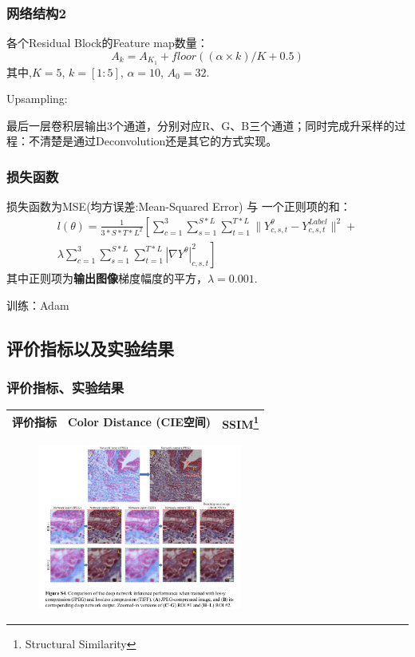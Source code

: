 \documentclass{beamer}
\begin{document}
\begin{frame}
\frametitle{网络结构2}
各个Residual Block的Feature map数量：
\begin{displaymath}
A_k = A_{K_1} + floor((\alpha \times k)/K + 0.5)
\end{displaymath}
其中,$K=5$, $k=[1:5]$, $\alpha=10$, $A_0 = 32$.
\vspace{1cm}
\par Upsampling:

最后一层卷积层输出3个通道，分别对应R、G、B三个通道；同时完成升采样的过程：不清楚是通过Deconvolution还是其它的方式实现。

\end{frame}


\begin{frame}
\frametitle{损失函数}
损失函数为MSE(均方误差:Mean-Squared Error) 与 一个正则项的和：
\begin{multline}
l(\theta) = \frac{1}{3 * S * T * L^2} \left[
\sum_{c=1}^{3}\sum_{s=1}^{S * L}\sum_{t=1}^{T * L} \parallel Y_{c, s, t}^{\theta} - Y_{c, s, t}^{Label} \parallel^2 + \right. \\
\left. \lambda \sum_{c=1}^{3}\sum_{s=1}^{S * L}\sum_{t=1}^{T * L}| \nabla Y^{\theta} |_{c, s, t}^2 \right]
\end{multline}
其中正则项为\textbf{输出图像}梯度幅度的平方，$\lambda=0.001$.

\vspace{6pt}
训练：Adam

\end{frame}



\subsection{评价指标以及实验结果}
\begin{frame}
\frametitle{评价指标、实验结果}
\begin{table}
\begin{tabular}{c|c|c}
\toprule
评价指标  &  Color Distance (CIE空间)   &   SSIM\footnote{Structural Similarity} \\
\bottomrule
\end{tabular}
\end{table}

\begin{figure}
\centering
\includegraphics[width=0.6\textwidth]{Results.png}
\end{figure}

\end{frame}
\end{document}
